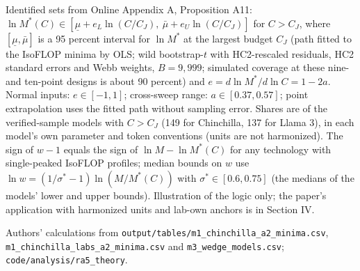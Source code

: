 \begin{table}[tp]
\begin{tablenotes}Identified sets from Online Appendix A, Proposition A11: $\ln M^*(C)\in[\underline\mu+e_L\ln(C/C_J),\ \bar\mu+e_U\ln(C/C_J)]$ for $C>C_J$, where $[\underline\mu,\bar\mu]$ is a 95 percent interval for $\ln M^*$ at the largest budget $C_J$ (path fitted to the IsoFLOP minima by OLS; wild bootstrap-$t$ with HC2-rescaled residuals, HC2 standard errors and Webb weights, $B=9{,}999$; simulated coverage at these nine- and ten-point designs is about 90 percent) and $e=d\ln M^*/d\ln C=1-2a$. Normal inputs: $e\in[-1,1]$; cross-sweep range: $a\in[0.37,0.57]$; point extrapolation uses the fitted path without sampling error. Shares are of the verified-sample models with $C>C_J$ (149 for Chinchilla, 137 for Llama 3), in each model's own parameter and token conventions (units are not harmonized). The sign of $w-1$ equals the sign of $\ln M-\ln M^*(C)$ for any technology with single-peaked IsoFLOP profiles; median bounds on $w$ use $\ln w=(1/\sigma^*-1)\ln(M/M^*(C))$ with $\sigma^*\in[0.6,0.75]$ (the medians of the models' lower and upper bounds). Illustration of the logic only; the paper's application with harmonized units and lab-own anchors is in Section IV.\end{tablenotes}
\begin{tablenotes}[Source]Authors' calculations from \texttt{output/tables/m1\_chinchilla\_a2\_minima.csv}, \texttt{m1\_chinchilla\_labs\_a2\_minima.csv} and \texttt{m3\_wedge\_models.csv}; \texttt{code/analysis/ra5\_theory}.\end{tablenotes}
\end{table}
